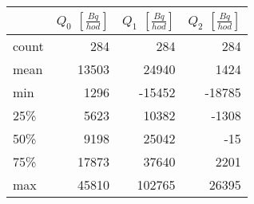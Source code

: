 \begin{tabular}{lrrr}
\toprule
{} &  $Q_0$ $\left[\si{\frac{Bq}{hod}}\right]$ &  $Q_1$ $\left[\si{\frac{Bq}{hod}}\right]$ &  $Q_2$ $\left[\si{\frac{Bq}{hod}}\right]$ \\
\midrule
count &                                       284 &                                       284 &                                       284 \\
mean  &                                     13503 &                                     24940 &                                      1424 \\
min   &                                      1296 &                                    -15452 &                                    -18785 \\
25\%   &                                      5623 &                                     10382 &                                     -1308 \\
50\%   &                                      9198 &                                     25042 &                                       -15 \\
75\%   &                                     17873 &                                     37640 &                                      2201 \\
max   &                                     45810 &                                    102765 &                                     26395 \\
\bottomrule
\end{tabular}
